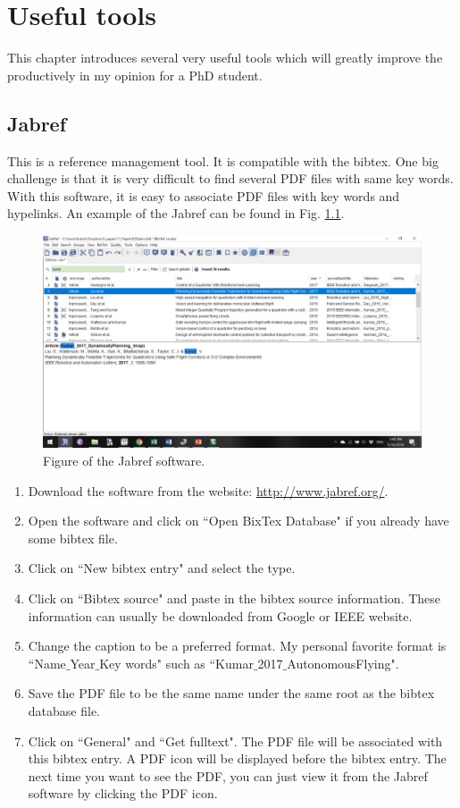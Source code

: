 \documentclass[idxtotoc,hyperref,openany]{labbook} %
\begin{document}
\chapter{Useful tools}

This chapter introduces several very useful tools which will greatly improve the productively in my opinion for a PhD student. 
\section{Jabref}
This is a reference management tool. It is compatible with the bibtex. One big challenge is that it is very difficult to find several PDF files with same key words. With this software, it is easy to associate PDF files with key words and hypelinks.  An example of the Jabref can be found in Fig. \ref{fig_jabref}. 


\begin{figure}[h!]
\centering
\includegraphics[scale=0.5]{./Figure/fig_jabref}
\caption{Figure of the Jabref software.}\label{fig_jabref}
\end{figure}



\begin{enumerate}
\item Download the software from the website: \url{http://www.jabref.org/}.
\item Open the software and click on ``Open BixTex Database" if you already have some bibtex file. 
\item Click on  ``New bibtex entry" and select the type.
\item Click on ``Bibtex source" and paste in the bibtex source information. These information can usually be downloaded from Google or IEEE website.
\item Change the caption to be a preferred format. My personal favorite format is ``Name$\_$Year$\_$Key words" such as ``Kumar$\_$2017$\_$AutonomousFlying".
\item Save the PDF file to be the same name under the same root as the bibtex database file.
\item Click on ``General" and ``Get fulltext". The PDF file will be associated with this bibtex entry. A PDF icon will be displayed before the bibtex entry. The next time you want to see the PDF, you can just view it from the Jabref software by clicking the  PDF icon.
\end{enumerate}
\end{document}
